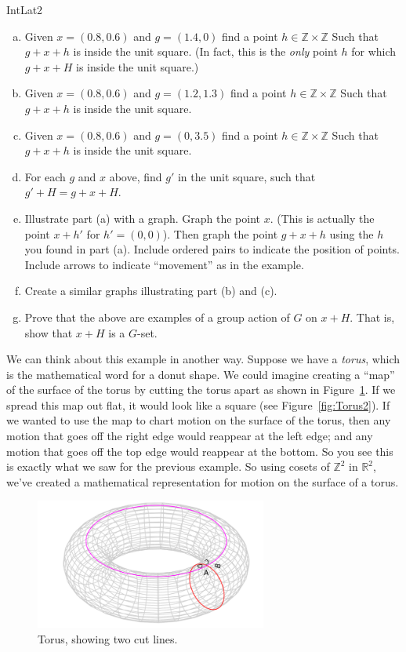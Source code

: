 \begin {exercise}{IntLat2}
\begin {enumerate}[(a)]
\item Given $x=(0.8,0.6)$ and $g=(1.4,0)$ find a point  $h\in \mathbb{Z}\times \mathbb{Z}$ Such that $g+x+h$ is inside the unit square.  (In fact, this is the \emph{only} point $h$ for which $g+x+H$ is inside the unit square.)
\item Given $x=(0.8,0.6)$ and $g=(1.2,1.3)$ find a point  $h\in \mathbb{Z}\times \mathbb{Z}$ Such that $g+x+h$ is inside the unit square.
\item Given $x=(0.8,0.6)$ and $g=(0,3.5)$ find a point  $h\in \mathbb{Z}\times \mathbb{Z}$ Such that $g+x+h$ is inside the unit square.
\item For each $g$ and $x$ above, find $g'$ in the unit square, such that $g'+H=g+x+H$.
\item Illustrate part (a) with a graph.  Graph the point $x$.  (This is actually the point $x+h'$ for $h'=(0,0)$).  Then graph the point $g+x+h$ using the $h$ you found in part (a).   Include ordered pairs to indicate the position of points.  Include arrows to indicate ``movement'' as in the example.
\item Create a similar graphs illustrating part (b) and (c).
\item Prove that the above are examples of a group action of $G$ on $x+H$.  That is, show that $x+H$ is a $G$-set. 
\end{enumerate}
\end {exercise}
We can think about this example in another way.  Suppose we have a \emph{torus}, which is the mathematical word for a donut shape. We could imagine creating a ``map'' of the surface of the torus by cutting the torus apart as shown in Figure~\ref{fig:Torus1}. If we spread this map out flat, it would look like a square (see Figure~\ref{fig:Torus2}). If we wanted to use the map to chart motion on the surface of the torus, then any motion that goes off the right edge would reappear at the left edge; and any motion that goes off the top edge would reappear at the bottom.  So you see this is exactly what we saw for the previous example. So using cosets of $\mathbb{Z}^2$ in $\mathbb{R}^2$, we've created a mathematical representation for motion on the surface of a torus.

\begin{figure}[ht]
\begin{center}
\includegraphics[width=3in]{images/Torus1.png}
\caption{Torus, showing two cut lines.}\label{fig:Torus1}
\end{center}
\end{figure}

